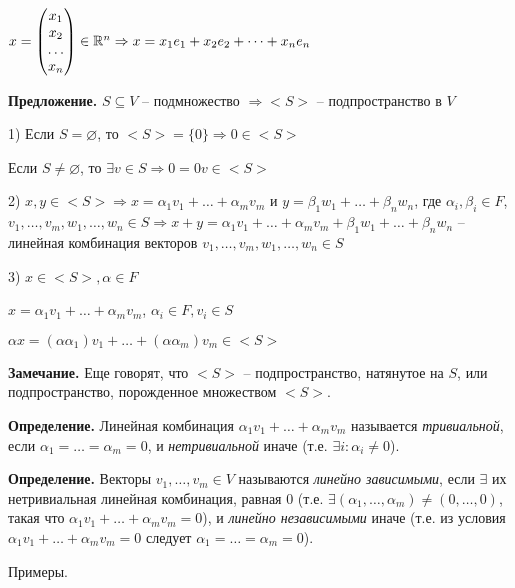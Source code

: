 $x = \begin{pmatrix} x_1 \\ x_2 \\ \dots \\ x_n \end{pmatrix} \in \mathbb{R}^n \Rightarrow x = x_1 e_1 + x_2 e_2 + \dots + x_n e_n$

\vspace{\baselineskip}
\textbf{Предложение.} $S \subseteq V$ -- подмножество $\Rightarrow <S>$ -- подпространство в $V$

1) Если $S = \varnothing$, то $<S> = \{0\} \Rightarrow 0 \in <S>$

Если $S \neq \varnothing$, то $\exists v \in S \Rightarrow 0 = 0 v \in <S>$

2) $x, y \in <S> \Rightarrow x = \alpha_1 v_1 + \dots + \alpha_m v_m$ и $y = \beta_1 w_1 + \dots + \beta_n w_n$, где $\alpha_i, \beta_i \in F$, $v_1, \dots, v_m, w_1, \dots, w_n \in S \Rightarrow x + y = \alpha_1 v_1 + \dots + \alpha_m v_m + \beta_1 w_1 + \dots + \beta_n w_n$ -- линейная комбинация векторов $v_1, \dots, v_m, w_1, \dots, w_n \in S$

3) $x \in <S>, \alpha \in F$

$x = \alpha_1 v_1 + \dots + \alpha_m v_m$, $\alpha_i \in F, v_i \in S$

$\alpha x = (\alpha \alpha_1)v_1 + \dots + (\alpha \alpha_m) v_m \in <S>$

\vspace{\baselineskip}
\textbf{Замечание.} Еще говорят, что $<S>$ -- подпространство, натянутое на $S$, или подпространство, порожденное множеством $<S>$.

\vspace{\baselineskip}
\textbf{Определение.} Линейная комбинация $\alpha_1 v_1 + \dots + \alpha_m v_m$ называется \textit{тривиальной}, если $\alpha_1 = \dots = \alpha_m = 0$, и \textit{нетривиальной} иначе (т.е. $\exists i: \alpha_i \neq 0$).

\vspace{\baselineskip}
\textbf{Определение.} Векторы $v_1, \dots, v_m \in V$ называются \textit{линейно зависимыми}, если $\exists$ их нетривиальная линейная комбинация, равная 0 (т.е. $\exists (\alpha_1, \dots, \alpha_m) \neq (0, \dots, 0)$, такая что $\alpha_1 v_1 + \dots + \alpha_m v_m = 0$), и \textit{линейно независимыми} иначе (т.е. из условия $\alpha_1 v_1 + \dots + \alpha_m v_m = 0$ следует $\alpha_1 = \dots = \alpha_m = 0$).

\vspace{\baselineskip}
Примеры.

